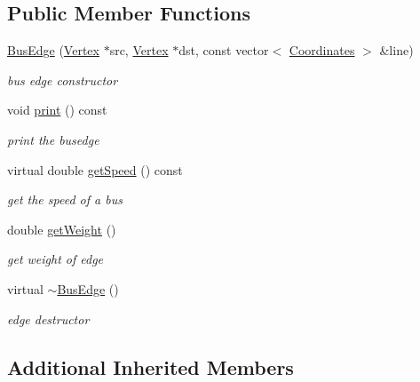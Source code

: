 \subsection*{Public Member Functions}
\begin{DoxyCompactItemize}
\item 
\hyperlink{class_bus_edge_a339f95411a13acf7c8b700af36a43f93}{Bus\+Edge} (\hyperlink{class_vertex}{Vertex} $\ast$src, \hyperlink{class_vertex}{Vertex} $\ast$dst, const vector$<$ \hyperlink{class_coordinates}{Coordinates} $>$ \&line)
\begin{DoxyCompactList}\small\item\em bus edge constructor \end{DoxyCompactList}\item 
\hypertarget{class_bus_edge_a8724578c3c10c755f3936e754c58bf57}{}void \hyperlink{class_bus_edge_a8724578c3c10c755f3936e754c58bf57}{print} () const \label{class_bus_edge_a8724578c3c10c755f3936e754c58bf57}

\begin{DoxyCompactList}\small\item\em print the busedge \end{DoxyCompactList}\item 
virtual double \hyperlink{class_bus_edge_ad89c82a7f0bf9a49610b5ef437f3dcca}{get\+Speed} () const 
\begin{DoxyCompactList}\small\item\em get the speed of a bus \end{DoxyCompactList}\item 
double \hyperlink{class_bus_edge_a186045a2fc5cf2694390552627b5f985}{get\+Weight} ()
\begin{DoxyCompactList}\small\item\em get weight of edge \end{DoxyCompactList}\item 
\hypertarget{class_bus_edge_ab8473fb0562c52e08ff70ae0b3ccf6b4}{}virtual \hyperlink{class_bus_edge_ab8473fb0562c52e08ff70ae0b3ccf6b4}{$\sim$\+Bus\+Edge} ()\label{class_bus_edge_ab8473fb0562c52e08ff70ae0b3ccf6b4}

\begin{DoxyCompactList}\small\item\em edge destructor \end{DoxyCompactList}\end{DoxyCompactItemize}
\subsection*{Additional Inherited Members}


